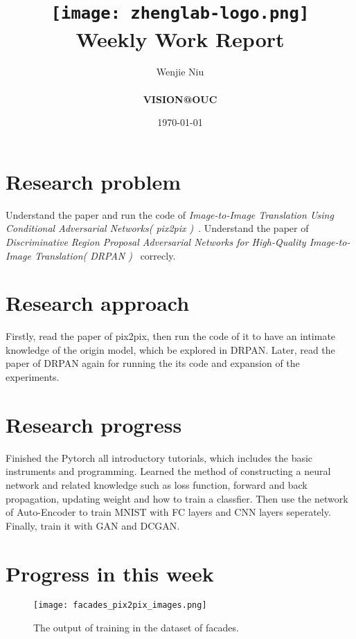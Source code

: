 \documentclass[a4paper]{article}
\title{
    \vspace*{1in}
    \texttt{[image: zhenglab-logo.png]} \\
    \vspace*{1.2in}
    \textbf{\huge Weekly Work Report}
    \vspace{0.2in}
}
\author{Wenjie Niu \\
    \vspace*{0.5in} \\
    \textbf{VISION@OUC} \\
    \vspace*{1in}
}
\date{\today}
\begin{document}
\maketitle
\setcounter{page}{0}
\thispagestyle{empty}
\newpage


\section{Research problem}

Understand the paper and run the code of \emph{Image-to-Image Translation Using Conditional Adversarial Networks( pix2pix )}~\cite{pix2pix}. Understand the paper of \emph{Discriminative Region Proposal Adversarial Networks for High-Quality Image-to-Image Translation( DRPAN )}~\cite{Wang2017Discriminative} correcly.\par

\section{Research approach}

Firstly, read the paper of pix2pix, then run the code of it to have an intimate knowledge of the origin model, which be explored in DRPAN. Later, read the paper of DRPAN again for running the its code and expansion of the experiments.\par

\section{Research progress}

Finished the Pytorch all introductory tutorials, which includes the basic instruments and programming. Learned the method of constructing a neural network and related knowledge such as loss function, forward and back propagation, updating weight and how to train a classfier. Then use the network of Auto-Encoder to train MNIST with FC layers and CNN layers seperately. Finally, train it with GAN and DCGAN.

\section{Progress in this week}

\begin{figure}[!htp]
	\begin{center}
		\texttt{[image: facades\_pix2pix\_images.png]}
	\end{center}
	\caption{The output of training in the dataset of facades.}
	\label{fig:facades_pix2pix_1}
\end{figure}
\end{document}

